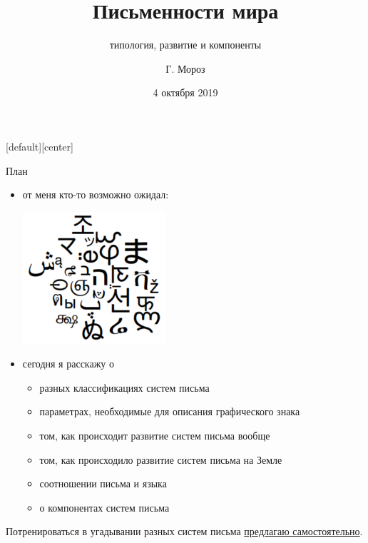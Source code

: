 
\setlength{\parindent}{0em}
[default][center]
\title[]{Письменности мира}
\subtitle{типология, развитие и компоненты}
\author[]{Г. Мороз}
\date{4 октября 2019}

\frame{\titlepage}
\begin{frame}{План}
\begin{itemize}
\item от меня кто-то возможно ожидал:
\begin{center}
\includegraphics[width=0.3\linewidth]{scripts.png}
\end{center}
\item сегодня я расскажу о
\begin{itemize}
\item разных классификациях систем письма
\item параметрах, необходимые для описания графического знака
\item том, как происходит развитие систем письма вообще
\item том, как происходило развитие систем письма на Земле
\item соотношении письма и языка
\item о компонентах систем письма
\end{itemize}
\end{itemize}
\vfill
Потренироваться в угадывании разных систем письма \href{https://goo.gl/forms/Bue8K65PxTLgeJlZ2}{предлагаю самостоятельно}.
\end{frame}
